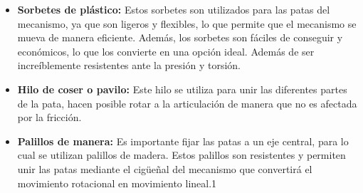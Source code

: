 \begin{itemize}
  \item \textbf{Sorbetes de plástico:} Estos sorbetes son utilizados para las patas del mecanismo, ya que son ligeros y flexibles, lo que permite que el mecanismo se mueva de manera eficiente. Además, los sorbetes son fáciles de conseguir y económicos, lo que los convierte en una opción ideal. Además de ser increíblemente resistentes ante la presión y torsión.
  
  \item \textbf{Hilo de coser o pavilo:} Este hilo se utiliza para unir las diferentes partes de la pata, hacen posible rotar a la articulación de manera que no es afectada por la fricción.
  
  \item \textbf{Palillos de manera:} Es importante fijar las patas a un eje central, para lo cual se utilizan palillos de madera. Estos palillos son resistentes y permiten unir las patas mediante el cigüeñal del mecanismo que convertirá el movimiento rotacional en movimiento lineal.1
  
\end{itemize}



